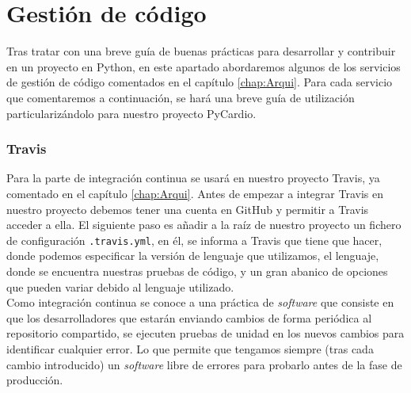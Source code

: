 \section{Gestión de código}
\label{subsec:}
Tras tratar con una breve guía de buenas prácticas para desarrollar y contribuir en un proyecto en Python, en este apartado abordaremos algunos de los servicios de gestión de código comentados en el capítulo \ref{chap:Arqui}. Para cada servicio que comentaremos a continuación, se hará una breve guía de utilización particularizándolo para nuestro proyecto PyCardio.

\subsubsection*{Travis}
\label{subsubsec:Travis}
Para la parte de integración continua se usará en nuestro proyecto Travis, ya comentado en el capítulo \ref{chap:Arqui}. Antes de empezar a integrar Travis en nuestro proyecto debemos tener una cuenta en GitHub y permitir a Travis acceder a ella. El siguiente paso es añadir a la raíz de nuestro proyecto un fichero de configuración \texttt{.travis.yml}, en él, se informa a Travis que tiene que hacer, donde podemos especificar la versión de lenguaje que utilizamos, el lenguaje, donde se encuentra nuestras pruebas de código, y un gran abanico de opciones que pueden variar debido al lenguaje utilizado. \\

Como integración continua se conoce a una práctica de \emph{software} que consiste en que los desarrolladores que estarán enviando cambios de forma periódica al repositorio compartido, se ejecuten pruebas de unidad en los nuevos cambios para identificar cualquier error. Lo que permite que tengamos siempre (tras cada cambio introducido) un \emph{software} libre de errores para probarlo antes de la fase de producción. \\

